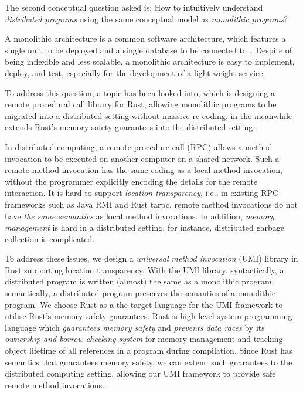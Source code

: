 \begin{center}
\vspace{-0.7em}
\vspace{-0.3em}
\end{center}

The second conceptual question asked is: How to intuitively understand \emph{distributed programs} using the same conceptual model as \emph{monolithic programs}?

A monolithic architecture is a common software architecture, which features a single unit to be deployed and a single database to be connected to~\citep{Taylor09}. Despite of being inflexible and less scalable, a monolithic architecture is easy to implement, deploy, and test, especially for the development of a light-weight service. 

To address this question, a topic has been looked into, which is designing a remote procedural call library for Rust, allowing monolithic programs to be migrated into a distributed setting without massive re-coding, in the meanwhile extends Rust's memory safety guarantees into the distributed setting.

In distributed computing, a remote procedure call (RPC) allows a method invocation to be executed on another computer on a shared network. Such a remote method invocation has the same coding as a local method invocation, without the programmer explicitly encoding the details for the remote interaction. It is hard to support \emph{location transparency}, i.e., in existing RPC frameworks such as Java RMI and Rust tarpc, remote method invocations do not have \emph{the same semantics} as local method invocations. In addition, \emph{memory management} is hard in a distributed setting, for instance, distributed garbage collection is complicated.

To address these issues, we design a \emph{universal method invocation} (UMI) library in Rust supporting location transparency. With the UMI library, syntactically, a distributed program is written (almost) the same as a monolithic program; semantically, a distributed program preserves the semantics of a monolithic program. We choose Rust as a the target language for the UMI framework to utilise Rust's memory safety guarantees. Rust is high-level system programming language which \emph{guarantees memory safety} and \emph{prevents data races} by its \emph{ownership and borrow checking system} for memory management and tracking object lifetime of all references in a program during compilation. Since Rust has semantics that guarantees memory safety, we can extend such guarantees to the distributed computing setting, allowing our UMI framework to provide safe remote method invocations.

